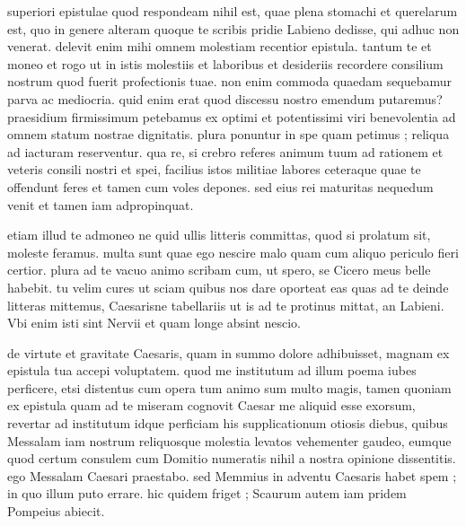 


 superiori epistulae quod respondeam nihil est, quae plena stomachi et querelarum est, quo in genere alteram quoque te scribis pridie Labieno dedisse, qui adhuc non venerat. delevit enim mihi omnem molestiam recentior epistula. tantum te et moneo et rogo ut in istis molestiis et laboribus et desideriis recordere consilium nostrum quod fuerit profectionis tuae. non enim commoda quaedam sequebamur parva ac mediocria. quid enim erat quod discessu nostro emendum putaremus? praesidium firmissimum petebamus ex optimi et potentissimi viri benevolentia ad omnem statum nostrae dignitatis. plura ponuntur in spe quam petimus ; reliqua ad iacturam reserventur. qua re, si crebro referes animum tuum ad rationem et veteris consili nostri et spei, facilius istos militiae labores ceteraque quae te offendunt feres et tamen cum voles depones. sed eius rei maturitas nequedum venit et tamen iam adpropinquat.

 etiam illud te admoneo ne quid ullis litteris committas, quod si prolatum sit, moleste feramus. multa sunt quae ego nescire malo quam cum aliquo periculo fieri certior. plura ad te vacuo animo scribam cum, ut spero, se Cicero meus belle habebit. tu velim cures ut sciam quibus nos dare oporteat eas quas ad te deinde litteras mittemus, Caesarisne tabellariis ut is ad te protinus mittat, an Labieni. Vbi enim isti sint Nervii et quam longe absint nescio.

 de virtute et gravitate Caesaris, quam in summo dolore adhibuisset, magnam ex epistula tua accepi voluptatem. quod me institutum ad illum poema iubes perficere, etsi distentus cum opera tum animo sum multo magis, tamen quoniam ex epistula quam ad te miseram cognovit Caesar me aliquid esse exorsum, revertar ad institutum idque perficiam his supplicationum otiosis diebus, quibus Messalam iam nostrum reliquosque molestia levatos vehementer gaudeo, eumque quod certum consulem cum Domitio numeratis nihil a nostra opinione dissentitis. ego Messalam Caesari praestabo. sed Memmius in adventu Caesaris habet spem ; in quo illum puto errare. hic quidem friget ; Scaurum autem iam pridem Pompeius abiecit.

